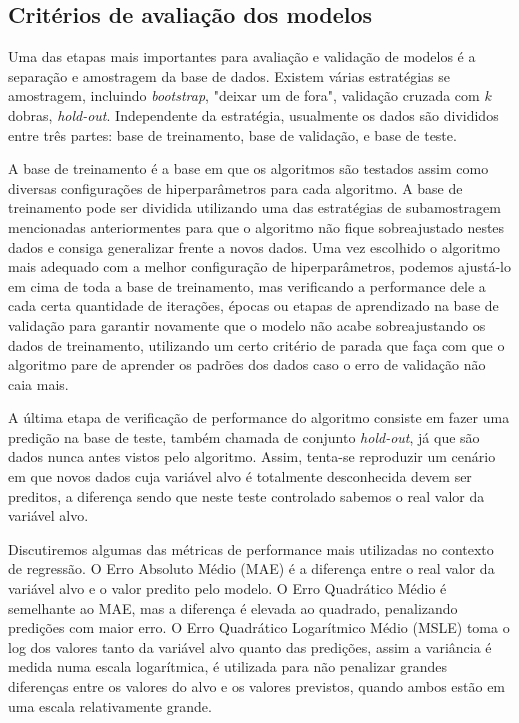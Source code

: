 \documentclass[twocolumn]{rbef}
\newcommand{\1}{\mathbbm{1}}
\begin{document}
\subsection{Critérios de avaliação dos modelos} \label{subsection22}

Uma das etapas mais importantes para avaliação e validação de modelos é a separação e amostragem da base de dados. Existem várias estratégias se amostragem, incluindo \textit{bootstrap}, "deixar um de fora", validação cruzada com $k$ dobras, \textit{hold-out}. Independente da estratégia, usualmente os dados são divididos entre três partes: base de treinamento, base de validação, e base de teste\cite{James}.

A base de treinamento é a base em que os algoritmos são testados assim como diversas configurações de hiperparâmetros para cada algoritmo. A base de treinamento pode ser dividida utilizando uma das estratégias de subamostragem mencionadas anteriormentes para que o algoritmo não fique sobreajustado nestes dados e consiga generalizar frente a novos dados. Uma vez escolhido o algoritmo mais adequado com a melhor configuração de hiperparâmetros, podemos ajustá-lo em cima de toda a base de treinamento, mas verificando a performance dele a cada certa quantidade de iterações, épocas ou etapas de aprendizado na base de validação para garantir novamente que o modelo não acabe sobreajustando os dados de treinamento, utilizando um certo critério de parada que faça com que o algoritmo pare de aprender os padrões dos dados caso o erro de validação não caia mais.

A última etapa de verificação de performance do algoritmo consiste em fazer uma predição na base de teste, também chamada de conjunto \textit{hold-out}, já que são dados nunca antes vistos pelo algoritmo. Assim, tenta-se reproduzir um cenário em que novos dados cuja variável alvo é totalmente desconhecida devem ser preditos, a diferença sendo que neste teste controlado sabemos o real valor da variável alvo.

Discutiremos algumas das métricas de performance mais utilizadas no contexto de regressão. O Erro Absoluto Médio (MAE) é a diferença entre o real valor da variável alvo e o valor predito pelo modelo. O Erro Quadrático Médio é semelhante ao MAE, mas a diferença é elevada ao quadrado, penalizando predições com maior erro. O Erro Quadrático Logarítmico Médio (MSLE) toma o log dos valores tanto da variável alvo quanto das predições, assim a variância é medida numa escala logarítmica, é utilizada para não penalizar grandes diferenças entre os valores do alvo e os valores previstos, quando ambos estão em uma escala relativamente grande.
\end{document}
